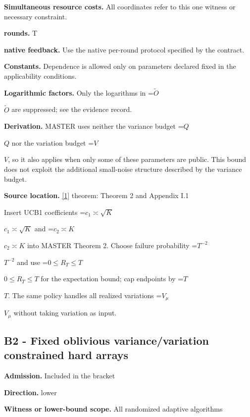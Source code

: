 \documentclass[10pt,a4paper]{article}
\newcommand{\AtlasMath}[1]{\par\begingroup\centering\setbox0=\hbox{$\displaystyle #1$}\ifdim\wd0>1.4\linewidth\typeout{ATLAS WIDE FORMULA: \the\wd0}\fi\ifdim\wd0>\linewidth\resizebox{\linewidth}{!}{\box0}\else\box0\fi\par\endgroup}
\newcommand{\AtlasInlineMath}[1]{\begingroup\setbox0=\hbox{$#1$}\ifdim\wd0>.4\linewidth\endgroup\AtlasMath{#1}\else\endgroup$#1$\fi}
\begin{document}
\textbf{Simultaneous resource costs.} All coordinates refer to this one witness or necessary constraint.



\textbf{rounds.} T



\textbf{native feedback.} Use the native per-round protocol specified by the contract.



\textbf{Constants.} Dependence is allowed only on parameters declared fixed in the applicability conditions.



\textbf{Logarithmic factors.} Only the logarithms in \AtlasInlineMath{\widetilde O} are suppressed; see the evidence record.



\textbf{Derivation.} MASTER uses neither the variance budget \AtlasInlineMath{Q} nor the variation budget \AtlasInlineMath{V}, so it also applies when only some of these parameters are public. This bound does not exploit the additional small-noise structure described by the variance budget.



\textbf{Source location.} \href{https://proceedings.mlr.press/v134/wei21b.html}{[1]} theorem: Theorem 2 and Appendix I.1



Insert UCB1 coefficients \AtlasInlineMath{c_1\asymp\sqrt K} and \AtlasInlineMath{c_2\asymp K} into MASTER Theorem 2. Choose failure probability \AtlasInlineMath{T^{-2}} and use \AtlasInlineMath{0\le R_T\le T} for the expectation bound; cap endpoints by \AtlasInlineMath{T}. The same policy handles all realized variations \AtlasInlineMath{V_\mu} without taking variation as input.



\subsection{B2 - Fixed oblivious variance/variation constrained hard arrays}


\textbf{Admission.} Included in the bracket



\textbf{Direction.} lower



\textbf{Witness or lower-bound scope.} All randomized adaptive algorithms
\end{document}
